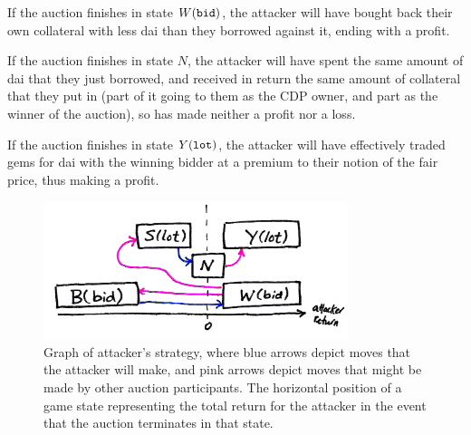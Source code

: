 \documentclass[a4paper,10pt]{article}
\begin{document}
\par If the auction finishes in state $W({\tt bid})$, the attacker will have bought back their own collateral with less dai than they borrowed against it, ending with a profit.
\par If the auction finishes in state $N$, the attacker will have spent the same amount of dai that they just borrowed, and received in return the same amount of collateral that they put in (part of it going to them as the CDP owner, and part as the winner of the auction), so has made neither a profit nor a loss.
\par If the auction finishes in state $Y({\tt lot})$, the attacker will have effectively traded gems for dai with the winning bidder at a premium to their notion of the fair price, thus making a profit.
\begin{figure}
    \centering
    \includegraphics[width=3.5in]{gamegraph}
    \caption{Graph of attacker's strategy, where blue arrows depict moves that the attacker will make, and pink arrows depict moves that might be made by other auction participants. The horizontal position of a game state representing the total return for the attacker in the event that the auction terminates in that state.}
\end{figure}
\end{document}
